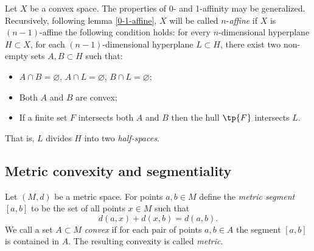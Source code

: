 \documentclass[12pt, a4paper]{article}
\begin{document}
\begin{definition}\label{def-n-affine}
    Let \(X\) be a convex space. The properties of 0- and 1-affinity may be generalized. Recursively, following lemma \ref{0-1-affine}, \(X\) will be called \(n\)-\textit{affine} if \(X\) is \((n-1)\)-affine the following condition holds: for every \(n\)-dimensional hyperplane \(H \subset X\), for each \((n-1)\)-dimensional hyperplane \(L \subset H\), there exist two non-empty sets \(A, B \subset H\) such that:

    \begin{itemize}
        \item \(A \cap B = \varnothing\), \(A \cap L = \varnothing\), \(B \cap L = \varnothing\);
        \item Both \(A\) and \(B\) are convex;
        \item If a finite set \(F\) intersects both \(A\) and \(B\) then the hull \(\tp{F}\) intersects \(L\).
    \end{itemize}

    That is, \(L\) divides \(H\) into two \textit{half-spaces}.
\end{definition}

\subsection{Metric convexity and segmentiality}
\label{mcs}

\begin{definition}\label{def-met-conv}
    Let \((M, d)\) be a metric space. For points \(a, b \in M\) define the \textit{metric segment} \([a, b]\) to be the set of all points \(x \in M\) such that \[d(a, x) + d(x, b) = d(a,b).\] We call a set \(A \subset M\) \textit{convex} if for each pair of points \(a, b \in A\) the segment \([a, b]\) is contained in \(A\). The resulting convexity is called \textit{metric}.
\end{definition}
\end{document}
